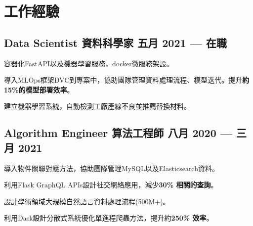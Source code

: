 \section{工作經驗}

\subsection*{Data Scientist 資料科學家 \hfill 五月 2021 --- 在職} 
    \begin{zitemize}
        \item 容器化FastAPI以及機器學習服務，docker微服務架設。
        \item 導入MLOps框架DVC到專案中，協助團隊管理資料處理流程、模型迭代。提升\textbf{約15\%的模型部署效率}。
        \item 建立機器學習系統，自動檢測工廠產線不良並推薦替換材料。
    \end{zitemize}


\subsection*{Algorithm Engineer 算法工程師 \hfill 八月 2020 --- 三月 2021} 
    \begin{zitemize}
        \item 導入物件關聯對應方法，協助團隊管理MySQL以及Elasticsearch資料。
        \item 利用Flask GraphQL APIs設計社交網絡應用，減少\textbf{30\% 相關的查詢}。
        \item 設計學術領域大規模自然語言資料處理流程(500M+)。
        \item 利用Dask設計分散式系統優化單進程爬蟲方法，提升約\textbf{250\% 效率}。
    \end{zitemize}


